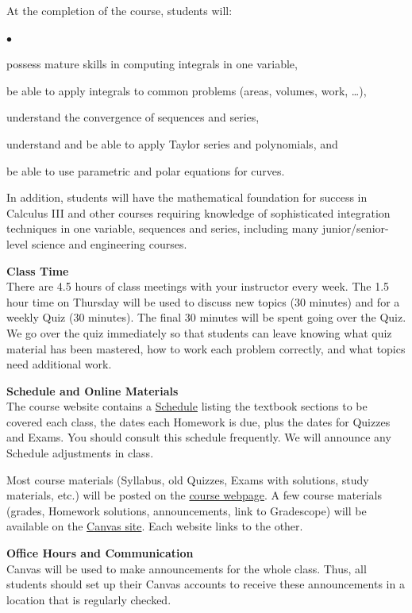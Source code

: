 \documentclass[12pt]{article}
\renewcommand{\emph}[1]{\textsf{\textbf{#1}}}
\newcommand{\localhead}[1]{\par\smallskip\textbf{#1} \smallskip\nobreak\\}%
\def\heading#1{\localhead{\large\emph{#1}}}
\newenvironment{clist}%
{\bgroup\parskip 0pt\begin{list}{$\bullet$}{\partopsep 4pt\topsep 0pt\itemsep -2pt}}%
{\end{list}\egroup}%
\begin{document}
At the completion of the course, students will:
\begin{clist}
\item possess mature skills in computing integrals in one variable,
\item be able to apply integrals to common problems (areas, volumes, work, \dots),
\item understand the convergence of sequences and series,
\item understand and be able to apply Taylor series and polynomials, and
\item be able to use parametric and polar equations for curves.
\end{clist}
In addition, students will have the mathematical foundation for success in Calculus III and other courses requiring knowledge of sophisticated integration techniques in one variable, sequences and series, including many junior/senior-level science and engineering courses.  

\newpage
\heading{Class Time}
There are 4.5 hours of class meetings with your instructor every week. The 1.5 hour time on Thursday will be used to discuss new topics (30 minutes) and for a weekly Quiz (30 minutes).  The final 30 minutes will be spent going over the Quiz.  We go over the quiz immediately so that students can leave knowing what quiz material has been mastered, how to work each problem correctly, and what topics need additional work. 

\heading{Schedule and Online Materials}
The course website contains a \href{https://docs.google.com/spreadsheets/d/e/2PACX-1vTOF-YOVqqB-MTwrxCpTC2GFHkvhlc3OMeVsltm1G4O2OvQQH-1Xhi9aUhZ8M506ZIhe1UIQKlEjSwB/pubhtml?gid=0&single=true}{Schedule} listing the textbook sections to be covered each class, the dates each Homework is due, plus the dates for Quizzes and Exams. You should consult this schedule frequently.  We will announce any Schedule adjustments in class.

Most course materials (Syllabus, old Quizzes, Exams with solutions, study materials, etc.) will be posted on the \href{https://uaf-math.github.io/calc2/}{course webpage}.  A few course materials (grades, Homework solutions, announcements, link to Gradescope) will be available on the \href{https://canvas.alaska.edu/courses/28364}{Canvas site}.  Each website links to the other.

\heading{Office Hours and Communication}
Canvas will be used to make announcements for the whole class. Thus, all students should set up their Canvas accounts to receive these announcements in a location that is regularly checked. 
\end{document}
